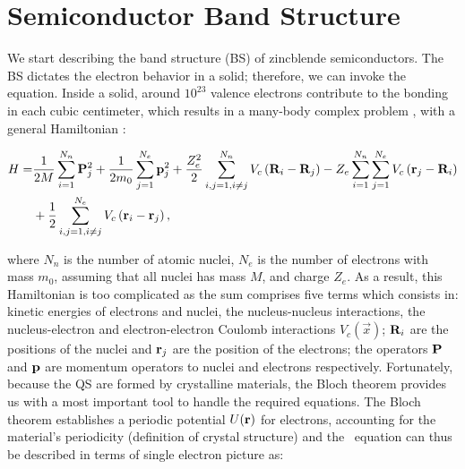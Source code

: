\section{Semiconductor Band Structure}
\label{sec:chapter-1-semiconductor}
\vspace{-10mm}
We start describing the band structure (\gls{BS}) of zincblende semiconductors. The \gls{BS} dictates the electron behavior in a solid; therefore, we can invoke the \sch\, equation. Inside a solid, around $10^{23}$ valence electrons contribute to the bonding in each cubic centimeter, which results in a many-body complex problem \cite{piprek2017handbook}, with a general Hamiltonian \cite{alloul2010introduction,cardona2005fundamentals}: 

\begin{equation}
\begin{split}
	H  =  &\dfrac{1}{2M}\sum\limits_{i=1}^{N_{n}} \mathrm{\bf P}_{j}^{2} + \dfrac{1}{2m_{0}} \sum\limits_{j=1}^{N_{e}} \mathrm{\bf p}_{j}^{2} + \dfrac{Z_{e}^{2}}{2} \sum\limits_{i,j=1,i\neq j}^{N_{n}} V_{c}\left(\mathrm{\bf R}_{i}-\mathrm{\bf R}_{j}\right)-Z_{e}\sum\limits_{i=1}^{N_{n}}\sum\limits_{j=1}^{N_{e}}V_{c}\left(\mathrm{\bf r}_{j}-\mathrm{\bf R}_{i}\right) \\
	   & + \dfrac{1}{2} \sum\limits_{i,j=1,i\neq j}^{N_{e}} V_{c} \left(\mathrm{\bf r}_{i}-\mathrm{\bf r}_{j}\right),
\end{split}
\label{eq:chapter-1-solid-hamiltonian}
\end{equation}

where  $N_{n}$ is the number of atomic nuclei, $N_{e}$ is the number of electrons with mass $m_{0}$, assuming that all nuclei has mass $M$, and charge $Z_{e}$. As a result, this Hamiltonian is too complicated as the sum comprises five terms which consists in: kinetic energies of electrons and nuclei, the nucleus-nucleus interactions, the nucleus-electron and electron-electron Coulomb interactions $V_{c}\left(\vec{x}\right)$; $\mathrm{\bf R}_{i}$ are the positions of the nuclei and $\mathrm{\bf r}_{j}$ are the position of the electrons; the operators $\mathrm{\bf P}$ and $\mathrm{\bf p}$ are momentum operators to nuclei and electrons respectively\cite{alloul2010introduction}.
Fortunately, because  the \gls{QS} are formed by crystalline materials, the Bloch theorem provides us with a most important tool to handle the required equations. The Bloch theorem establishes a periodic potential $U(\displaystyle\mathrm{\bf r})$ for electrons, accounting for the material's periodicity (definition of crystal structure) and the \sch\, equation can thus be described in terms of single electron picture as:  


